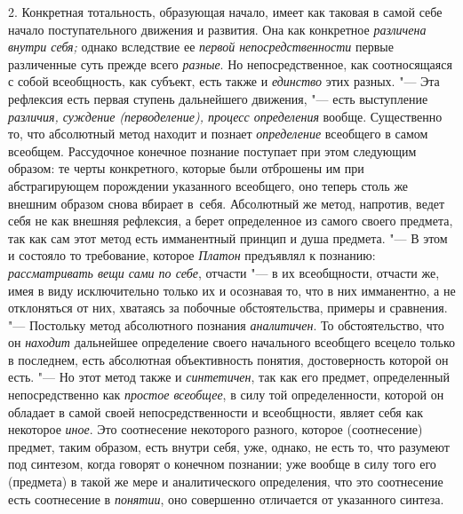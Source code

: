 2. Конкретная тотальность, образующая начало, имеет как
таковая в самой себе начало поступательного движения и развития. Она как
конкретное {\em различена внутри себя;}
однако вследствие ее {\em первой непосредственности}
первые различенные суть прежде всего {\em разные}. Но
непосредственное, как соотносящаяся с собой всеобщность, как субъект, есть
также и {\em единство} этих разных. "--- Эта рефлексия есть первая
ступень дальнейшего движения, "--- есть выступление
{\em различия, суждение (перводеление), процесс определения}
вообще. Существенно то, что абсолютный метод находит и
познает {\em определение}
всеобщего в самом всеобщем. Рассудочное конечное познание
поступает при этом следующим образом: те черты конкретного, которые были
отброшены им при абстрагирующем порождении указанного всеобщего, оно теперь
столь же внешним образом снова вбирает в~себя. Абсолютный же метод,
напротив, ведет себя не как внешняя рефлексия, а берет определенное из
самого своего предмета, так как сам этот метод есть имманентный принцип и
душа предмета. "--- В этом и состояло то
требование, которое {\em Платон}
предъявлял к познанию:
{\em рассматривать вещи сами по себе},
отчасти "--- в их всеобщности, отчасти же, имея в
виду исключительно только их и осознавая то, что в них имманентно, а не
отклоняться от них, хватаясь за побочные обстоятельства, примеры и
сравнения. "--- Постольку метод абсолютного познания
{\em аналитичен}. То
обстоятельство, что он {\em находит}
дальнейшее определение своего начального всеобщего всецело
только в последнем, есть абсолютная объективность понятия, достоверность
которой он есть. "--- \label{bkm:bmpg224a}Но этот метод также и
{\em синтетичен}, так как
его предмет, определенный непосредственно как {\em простое всеобщее}, в
силу той определенности, которой он обладает в самой своей
непосредственности и всеобщности, являет себя как некоторое
{\em иное}. Это
соотнесение некоторого разного, которое (соотнесение) предмет, таким
образом, есть внутри себя, уже, однако, не есть то, что разумеют под
синтезом, когда говорят о конечном познании; уже вообще в силу того его
(предмета) в такой же мере и аналитического определения, что это
соотнесение есть соотнесение в {\em понятии}, оно
совершенно отличается от указанного синтеза.

